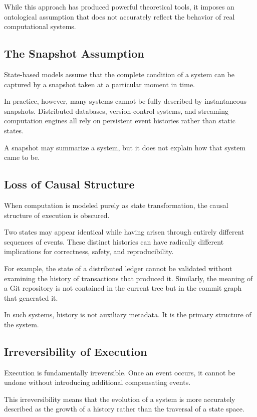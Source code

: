 \documentclass[12pt]{article}
\begin{document}
While this approach has produced powerful theoretical tools,
it imposes an ontological assumption that does not accurately
reflect the behavior of real computational systems.

\subsection{The Snapshot Assumption}

State-based models assume that the complete condition of a system
can be captured by a snapshot taken at a particular moment in time.

In practice, however, many systems cannot be fully described
by instantaneous snapshots. Distributed databases, version-control
systems, and streaming computation engines all rely on persistent
event histories rather than static states.

A snapshot may summarize a system, but it does not explain
how that system came to be.

\subsection{Loss of Causal Structure}

When computation is modeled purely as state transformation,
the causal structure of execution is obscured.

Two states may appear identical while having arisen through
entirely different sequences of events. These distinct histories
can have radically different implications for correctness,
safety, and reproducibility.

For example, the state of a distributed ledger cannot be validated
without examining the history of transactions that produced it.
Similarly, the meaning of a Git repository is not contained in the
current tree but in the commit graph that generated it.

In such systems, history is not auxiliary metadata.
It is the primary structure of the system.

\subsection{Irreversibility of Execution}

Execution is fundamentally irreversible. Once an event occurs,
it cannot be undone without introducing additional compensating
events.

This irreversibility means that the evolution of a system
is more accurately described as the growth of a history
rather than the traversal of a state space.
\end{document}
